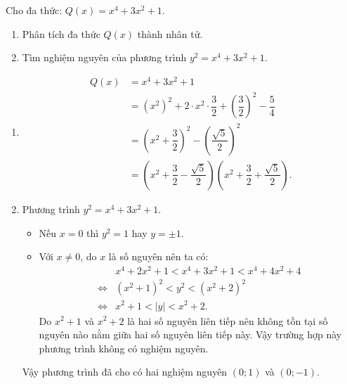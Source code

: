 \begin{ex}%
 Cho đa thức: $Q(x) = x^4 + 3x^2 + 1$.
 \begin{enumerate}
  \item Phân tích đa thức $Q(x)$ thành nhân tử.
  \item Tìm nghiệm nguyên của phương trình $y^2 = x^4 + 3x^2 + 1$.
 \end{enumerate}
 \loigiai
 {
 \begin{enumerate}
  \item \textrm{}
  \begin{align*}
   Q(x) & = x^4 + 3x^2 + 1 \\
        & = (x^2)^2 + 2 \cdot x^2 \cdot \dfrac{3}{2} + \left( \dfrac{3}{2} \right)^2 - \dfrac{5}{4} \\
        & = \left( x^2 + \dfrac{3}{2} \right)^2 - \left( \dfrac{\sqrt{5}}{2} \right)^2 \\
        & = \left( x^2 + \dfrac{3}{2} - \dfrac{\sqrt{5}}{2} \right) \left( x^2 + \dfrac{3}{2} + \dfrac{\sqrt{5}}{2} \right).
  \end{align*}
  \item Phương trình $y^2 = x^4 + 3x^2 + 1$.
   \begin{itemize}
    \item Nếu $x = 0$ thì $y^2 = 1$ hay $y = \pm 1$.
    \item Với $x \neq 0$, do $x$ là số nguyên nên ta có:
    \begin{align*}
     				 & x^4 + 2x^2 + 1 < x^4 + 3x^2 + 1 < x^4 + 4x^2 + 4 \\
     \Leftrightarrow & (x^2 + 1)^2 < y^2 < (x^2 + 2)^2 \\
     \Leftrightarrow & x^2 + 1 < |y| < x^2 + 2.
    \end{align*}
    Do $x^2 + 1$ và $x^2 + 2$ là hai số nguyên liên tiếp nên không tồn tại số nguyên nào nằm giữa hai số nguyên liên tiếp này. Vậy trường hợp này phương trình không có nghiệm nguyên.
   \end{itemize}
   Vậy phương trình đã cho có hai nghiệm nguyên $(0;1)$ và $(0;-1)$.
 \end{enumerate}
 }
\end{ex}


